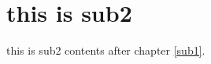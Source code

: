 \documentclass[master.tex]{subfiles}
\begin{document}
\chapter{this is sub2\label{sub2}}

this is sub2 contents after chapter \ref{sub1}.
\end{document}
